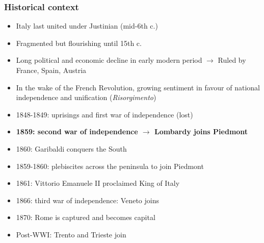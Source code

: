 \documentclass[10pt]{beamer}
\begin{document}
\begin{frame}
    \frametitle{Historical context}
    
    \begin{itemize}
        \item Italy last united under Justinian (mid-6th c.)
        \item Fragmented but flourishing until 15th c.
        \item Long political and economic decline in early modern period $\rightarrow$ Ruled by France, Spain, Austria
        \item In the wake of the French Revolution, growing sentiment in favour of national independence and unification (\textit{Risorgimento})
        \pause
        \item 1848-1849: uprisings and first war of independence (lost)
        \item \textbf{1859: second war of independence $\rightarrow$ Lombardy joins Piedmont}
        \item 1860: Garibaldi conquers the South
        \item 1859-1860: plebiscites across the peninsula to join Piedmont
        \item 1861: Vittorio Emanuele II proclaimed King of Italy
        \item 1866: third war of independence: Veneto joins
        \item 1870: Rome is captured and becomes capital
        \item Post-WWI: Trento and Trieste join
    \end{itemize}
    
\end{frame}
\end{document}
